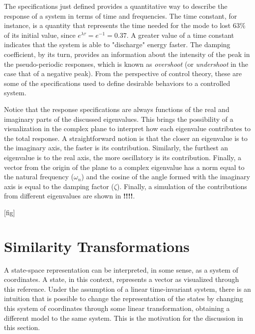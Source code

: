 \documentclass[a4paper,11pt]{book}
\numberwithin{figure}{chapter}
\numberwithin{equation}{chapter}
\numberwithin{table}{chapter}
\theoremstyle{definition}
\begin{document}
The specifications just defined provides a quantitative way to describe the response of a system in terms of time and frequencies. The time constant, for instance, is a quantity that represents the time needed for the mode to lost $63\%$ of its initial value, since $e^{\lambda \tau} = e^{-1} = 0.37$. A greater value of a time constant indicates that the system is able to "discharge" energy faster. The damping coefficient, by its turn, provides an information about the intensity of the peak in the pseudo-periodic responses, which is known as \textit{overshoot} (or \textit{undershoot} in the case that of a negative peak). From the perspective of control theory, these are some of the specifications used to define desirable behaviors to a controlled system.

Notice that the response specifications are always functions of the real and imaginary parts of the discussed eigenvalues. This brings the possibility of a visualization in the complex plane to interpret how each eigenvalue contributes to the total response. A straightforward notion is that the closer an eigenvalue is to the imaginary axis, the faster is its contribution. Similarly, the furthest an eigenvalue is to the real axis, the more oscillatory is its contribution. Finally, a vector from the origin of the plane to a complex eigenvalue has a norm equal to the natural frequency ($\omega_n$) and the cosine of the angle formed with the imaginary axis is equal to the damping factor ($\zeta$). Finally, a simulation of the contributions from different eigenvalues are shown in \textbf{!!!!}.

[fig] 


\section{Similarity Transformations}

A state-space representation can be interpreted, in some sense, as a system of coordinates. A state, in this context, represents a vector as visualized through this reference. Under the assumption of a linear time-invariant system, there is an intuition that is possible to change the representation of the states by changing this system of coordinates through some linear transformation, obtaining a different model to the same system. This is the motivation for the discussion in this section.
\end{document}
